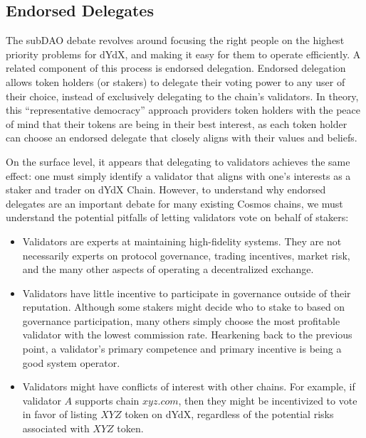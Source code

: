     \subsection{Endorsed Delegates}

        The subDAO debate revolves around focusing the right people on the highest priority problems for dYdX, and making it easy for them to operate efficiently. A related component of this process is endorsed delegation. Endorsed delegation allows token holders (or stakers) to delegate their voting power to any user of their choice, instead of exclusively delegating to the chain's validators. In theory, this ``representative democracy'' approach providers token holders with the peace of mind that their tokens are being in their best interest, as each token holder can choose an endorsed delegate that closely aligns with their values and beliefs. 

        On the surface level, it appears that delegating to validators achieves the same effect: one must simply identify a validator that aligns with one's interests as a staker and trader on dYdX Chain. However, to understand why endorsed delegates are an important debate for many existing Cosmos chains, we must understand the potential pitfalls of letting validators vote on behalf of stakers:

        \begin{itemize}
            \item Validators are experts at maintaining high-fidelity systems. They are not necessarily experts on protocol governance, trading incentives, market risk, and the many other aspects of operating a decentralized exchange.
            \item Validators have little incentive to participate in governance outside of their reputation. Although some stakers might decide who to stake to based on governance participation, many others simply choose the most profitable validator with the lowest commission rate. Hearkening back to the previous point, a validator's primary competence and primary incentive is being a good system operator.
            \item Validators might have conflicts of interest with other chains. For example, if validator $A$ supports chain $xyz.com$, then they might be incentivized to vote in favor of listing $XYZ$ token on dYdX, regardless of the potential risks associated with $XYZ$ token.
        \end{itemize}


